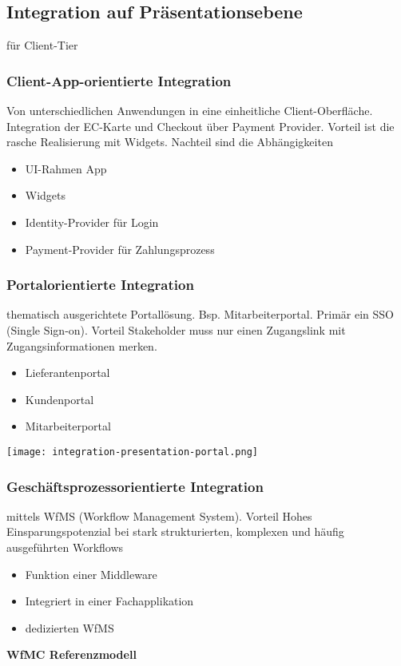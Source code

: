 
\subsection{Integration auf Präsentationsebene}

für Client-Tier

\subsubsection{Client-App-orientierte Integration}

Von unterschiedlichen Anwendungen in eine einheitliche Client-Oberfläche. Integration der EC-Karte und Checkout über Payment Provider. Vorteil ist die rasche Realisierung mit Widgets. Nachteil sind die Abhängigkeiten

\begin{itemize}
    \item UI-Rahmen App
    \item Widgets
    \item Identity-Provider für Login
    \item Payment-Provider für Zahlungsprozess
\end{itemize}

\subsubsection{Portalorientierte Integration}
thematisch ausgerichtete Portallösung. Bsp. Mitarbeiterportal. Primär ein SSO (Single Sign-on). Vorteil Stakeholder muss nur einen Zugangslink mit Zugangsinformationen merken.

\begin{itemize}
    \item Lieferantenportal
    \item Kundenportal
    \item Mitarbeiterportal
\end{itemize}

\texttt{[image: integration-presentation-portal.png]}

\subsubsection{Geschäftsprozessorientierte Integration}

mittels WfMS (Workflow Management System). Vorteil Hohes Einsparungspotenzial bei stark strukturierten, komplexen und häufig ausgeführten Workflows

\begin{itemize}
    \item Funktion einer Middleware
    \item Integriert in einer Fachapplikation
    \item dedizierten WfMS
\end{itemize}
\vspace{10pt}
\textbf{WfMC Referenzmodell}

